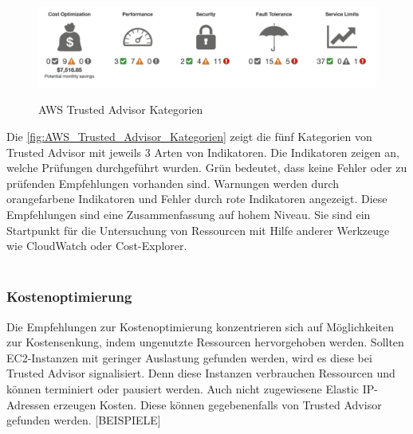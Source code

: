\begin{figure}[h!]
      \centering
      \includegraphics[scale=0.4]{sources/AWS_Trusted_Advisor_Kategorien}
      \caption[AWS Trusted Advisor Kategorien]{}
      \label{fig:AWS_Trusted_Advisor_Kategorien} 
      AWS Trusted Advisor Kategorien\cite{AMZ20}
\end{figure}
Die \autoref{fig:AWS_Trusted_Advisor_Kategorien} zeigt die fünf Kategorien von Trusted Advisor mit jeweils 3 Arten von Indikatoren. Die Indikatoren zeigen an, welche Prüfungen durchgeführt wurden. Grün bedeutet, dass keine Fehler oder zu prüfenden Empfehlungen vorhanden sind. Warnungen werden durch orangefarbene Indikatoren und Fehler durch rote Indikatoren angezeigt. Diese Empfehlungen sind eine Zusammenfassung auf hohem Niveau. Sie sind ein Startpunkt für die Untersuchung von Ressourcen mit Hilfe anderer Werkzeuge wie CloudWatch oder Cost-Explorer.%
\\\\

\subsubsection*{Kostenoptimierung}
Die Empfehlungen zur Kostenoptimierung konzentrieren sich auf Möglichkeiten zur Kostensenkung, indem ungenutzte Ressourcen hervorgehoben werden. 
Sollten EC2-Instanzen mit geringer Auslastung gefunden werden, wird es diese bei Trusted Advisor signalisiert. Denn diese Instanzen verbrauchen Ressourcen und können terminiert oder pausiert werden. %
Auch nicht zugewiesene Elastic IP-Adressen erzeugen Kosten. Diese können gegebenenfalls von Trusted Advisor gefunden werden. %
[BEISPIELE]

